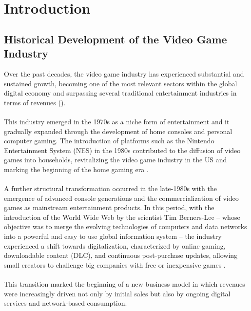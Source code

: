 \chapter{Introduction}
\section{Historical Development of the Video Game Industry}
Over the past decades, the video game industry has experienced substantial and sustained growth, becoming one of the most relevant sectors within the global digital economy and surpassing several traditional entertainment industries in terms of revenues (\cite{npd2009more}).
\\\\
This industry emerged in the 1970s as a niche form of entertainment and it
gradually expanded through the development of home consoles and personal computer gaming. The introduction of platforms such as the Nintendo Entertainment System (NES) in the 1980s contributed to the diffusion of video games into households, revitalizing the video game industry in the US and marking the beginning of the home gaming era \citep{ebsco_nes}.
\\\\
A further structural transformation occurred in the late-1980s with the emergence of advanced console generations and the commercialization of video games as mainstream entertainment products. In this period, with the introduction of the World Wide Web by the scientist Tim Berners-Lee -- whose objective was to merge the evolving technologies of computers and data networks into a powerful and easy to use global information system -- the industry experienced a shift towards digitalization, characterized by online gaming, downloadable content (DLC), and continuous post-purchase updates, allowing small creators to challenge big companies with free or inexpensive games \citep{WWW_Birth, ebsco_rise_video_games, hp2024dlc}. 
\\\\
This transition marked the beginning of a new business model in which revenues were increasingly driven not only by initial sales but also by ongoing digital services and network-based consumption.

